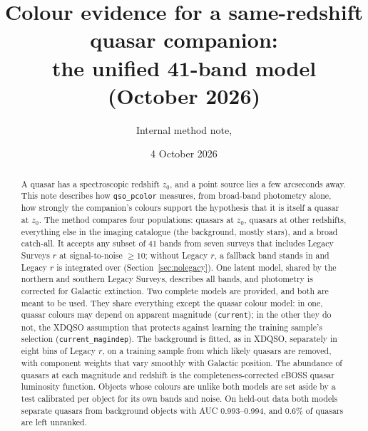 \documentclass[11pt,a4paper]{article}
\title{Colour evidence for a same-redshift quasar companion:\\ the unified 41-band model (October 2026)}
\author{Internal method note, \code{qso\_pcolor}}
\date{4 October 2026}
\newcommand{\code}[1]{\texttt{#1}}
\begin{document}
\maketitle

\begin{abstract}
A quasar has a spectroscopic redshift $z_0$, and a point source lies a few arcseconds away.
This note describes how \code{qso\_pcolor} measures, from broad-band photometry alone, how
strongly the companion's colours support the hypothesis that it is itself a quasar at $z_0$. The
method compares four populations: quasars at $z_0$, quasars at other redshifts, everything else
in the imaging catalogue (the background, mostly stars), and a broad catch-all. It accepts any
subset of 41 bands from seven surveys that includes Legacy Surveys $r$ at signal-to-noise $\geq10$; without
Legacy $r$, a fallback band stands in and Legacy $r$ is integrated over (Section~\ref{sec:nolegacy}).
One latent model, shared by the northern and southern Legacy Surveys, describes all bands, and
photometry is corrected for Galactic extinction. Two complete models are provided, and both are meant to
be used. They share everything except the quasar colour model: in one, quasar colours may depend on
apparent magnitude (\code{current}); in the other they do not, the XDQSO assumption
that protects against learning the training sample's selection (\code{current\_magindep}). The
background is fitted, as in XDQSO, separately in eight bins of Legacy $r$, on a training sample from
which likely quasars are removed, with component weights that vary smoothly with Galactic position.
The abundance of quasars at each magnitude and redshift is the completeness-corrected eBOSS quasar
luminosity function. Objects whose colours are unlike both models are set aside by a test calibrated per
object for its own bands and noise. On held-out data both models separate quasars from background objects
with AUC 0.993--0.994, and 0.6\% of quasars are left unranked.
\end{abstract}

\tableofcontents
\newpage

\end{document}
